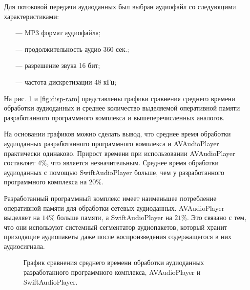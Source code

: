     \par Для потоковой передачи аудиоданных был выбран аудиофайл со следующими характеристиками:
    \begin{itemize}
        \item[---] MP3 формат аудиофайла;
        \item[---] продолжительность аудио 360 сек.;
        \item[---] разрешение звука 16 бит;
        \item[---] частота дискретизации 48 кГц;
    \end{itemize}

    \par На рис. \ref{fig:disp-time} и \ref{fig:disp-ram} представлены графики сравнения среднего времени обработки аудиоданных 
    и среднее количество выделяемой оперативной памяти разработанного программного комплекса и вышеперечисленных аналогов.
    
    \par На основании графиков можно сделать вывод, 
    что среднее время обработки аудиоданных разработанного программного комплекса и AVAudioPlayer практически одинаково.
    Прирост времени при использовании AVAudioPlayer составляет $4\%$, что является незначительным.
    Среднее время обработки аудиоданных с помощью SwiftAudioPlayer больше, чем у разработанного программного комплекса на $20\%$.

    \par Разработанный программный комплекс имеет наименьшее потребление оперативной памяти для обработки сетевых аудиоданных.
    AVAudioPlayer выделяет на $14\%$ больше памяти, а SwiftAudioPlayer на $21\%$. Это связано с тем, 
    что они используют системный сегментатор аудиопакетов, 
    который хранит приходящие аудиопакеты даже после воспроизведения содержащегося в них аудиосигнала.

    \begin{figure}[!h]
        \caption{
            График сравнения среднего времени обработки аудиоданных
            разработанного программного комплекса, AVAudioPlayer и SwiftAudioPlayer.
        }
        \label{fig:disp-time}
    \end{figure}

